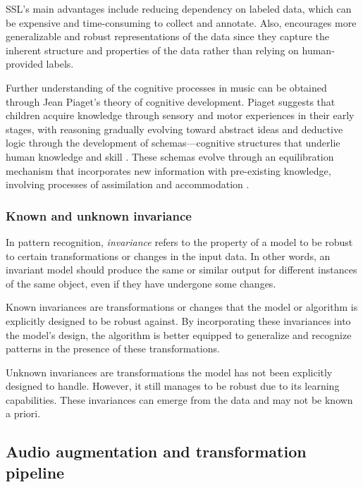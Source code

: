 SSL's main advantages include reducing dependency on labeled data, which can be expensive and time-consuming to collect and annotate. Also, encourages more generalizable and robust representations of the data since they capture the inherent structure and properties of the data rather than relying on human-provided labels.

Further understanding of the cognitive processes in music can be obtained through Jean Piaget's theory of cognitive development. Piaget suggests that children acquire knowledge through sensory and motor experiences in their early stages, with reasoning gradually evolving toward abstract ideas and deductive logic through the development of schemas—cognitive structures that underlie human knowledge and skill \cite{Huitt2003PiagetsDevelopment}. These schemas evolve through an equilibration mechanism that incorporates new information with pre-existing knowledge, involving processes of assimilation and accommodation \cite{audioselfsupsurvey}.

\subsubsection{Known and unknown invariance}

In pattern recognition, \textit{invariance} refers to the property of a model to be robust to certain transformations or changes in the input data. In other words, an invariant model should produce the same or similar output for different instances of the same object, even if they have undergone some changes.

\begin{definition}
Known invariances are transformations or changes that the model or algorithm is explicitly designed to be robust against. By incorporating these invariances into the model's design, the algorithm is better equipped to generalize and recognize patterns in the presence of these transformations.
\end{definition}

\begin{definition}

Unknown invariances are transformations the model has not been explicitly designed to handle. However, it still manages to be robust due to its learning capabilities. These invariances can emerge from the data and may not be known a priori. 
\end{definition}

\subsection{Audio augmentation and transformation pipeline}


